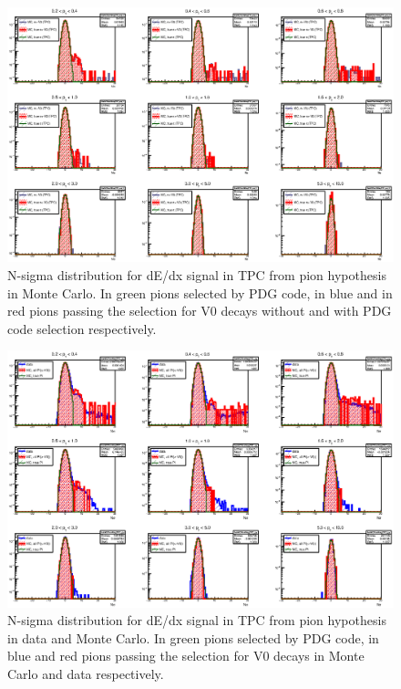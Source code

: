 \begin{figure}[!h]
 \centering
 \includegraphics[angle=0, width=13cm]{./FigCap5/MCPionTPC_AllTrueSig.eps}
 \caption{N-sigma distribution for dE/dx signal in TPC from pion hypothesis in Monte Carlo. In green pions selected by PDG code, in blue and in red pions passing the selection for V0 decays without and with PDG code selection respectively.}
 \label{fig:MCPionsTPC} 
\end{figure}

\begin{figure}[!h]
 \centering
 \includegraphics[angle=0, width=13cm]{./FigCap5/PionTPC_DataMC.eps}
 \caption{N-sigma distribution for dE/dx signal in TPC from pion hypothesis in data and Monte Carlo. In green pions selected by PDG code, in blue and red pions passing the selection for V0 decays in Monte Carlo and data respectively.}
 \label{fig:DataPionsTPC} 
\end{figure}

